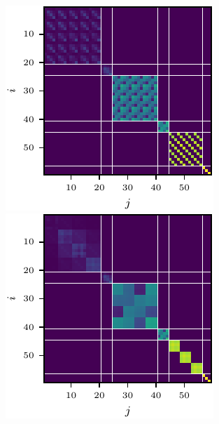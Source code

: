 \begin{figure}[!h]
\begin{minipage}[t]{0.495\linewidth}
  \end{minipage}
  \\
  \begin{minipage}[t]{0.495\linewidth}
    \centering
    \includegraphics[width=\linewidth]{../kfs/plots/synthetic_cvec_hessian_bda.pdf}
  \end{minipage}
  \hfill
  \begin{minipage}[t]{0.495\linewidth}
    \centering
    \includegraphics[width=\linewidth]{../kfs/plots/synthetic_rvec_hessian_bda.pdf}

\end{minipage}
\end{figure}
